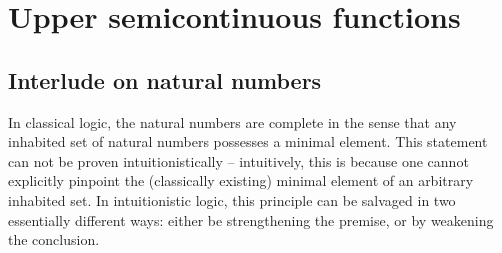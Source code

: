 \documentclass[10pt]{amsart}
\theoremstyle{definition}
\theoremstyle{plain}
\theoremstyle{remark}
\newcommand{\?}{\,{:}\,}
\renewcommand{\_}{\mathpunct{.}\,}
\begin{document}
\section{Upper semicontinuous functions}

\subsection{Interlude on natural numbers}
In classical logic, the natural numbers are complete in the sense that any
inhabited set of natural numbers possesses a minimal element. This statement
can not be proven intuitionistically -- intuitively, this is because one cannot
explicitly pinpoint the (classically existing) minimal element of an arbitrary
inhabited set. In intuitionistic logic, this principle can be salvaged in two
essentially different ways: either be strengthening the premise, or by
weakening the conclusion.
\end{document}
